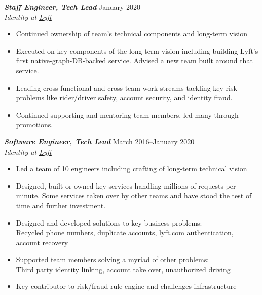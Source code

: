 \documentclass[line,letterpaper]{resume}
\begin{document}
\begin{resume}
    {\sl\textbf{Staff Engineer, Tech Lead}} \hfill January 2020--\\
    \emph{Identity at \underline{\href{https://www.lyft.com/}{Lyft}}}
    \begin{itemize}
        \item Continued ownership of team's technical components and long-term
            vision
        \item Executed on key components of the long-term vision including
            building Lyft's first native-graph-DB-backed service. Advised a new
            team built around that service.
        \item Leading cross-functional and cross-team work-streams tackling key
            risk problems like rider/driver safety, account security, and
            identity fraud.
        \item Continued supporting and mentoring team members, led many through promotions.
    \end{itemize}
    \vspace{6pt}

    {\sl\textbf{Software Engineer, Tech Lead}} \hfill March 2016--January 2020\\
    \emph{Identity at \underline{\href{https://www.lyft.com/}{Lyft}}}
    \begin{itemize}
        \item Led a team of 10 engineers including crafting of long-term technical vision
        \item Designed, built or owned key services handling millions of
            requests per minute. Some services taken over by other teams and
            have stood the test of time and further investment.
        \item Designed and developed solutions to key business problems: \\
            Recycled phone numbers, duplicate accounts, lyft.com authentication,
            account recovery
        \item Supported team members solving a myriad of other problems: \\
            Third party identity linking, account take over, unauthorized driving
        \item Key contributor to risk/fraud rule engine and challenges infrastructure
    \end{itemize}
    \vspace{6pt}


\end{resume}
\end{document}
